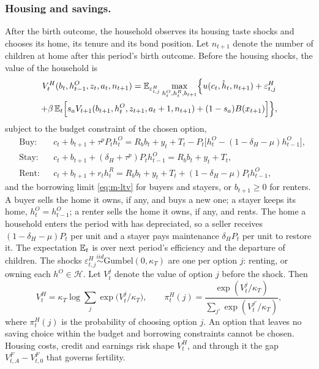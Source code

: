 \subsubsection*{Housing and savings.}
After the birth outcome, the household observes its housing taste shocks and
chooses its home, its tenure and its bond position. Let $n_{t+1}$ denote the
number of children at home after this period's birth outcome. Before the
housing shocks, the value of the household is
\begin{multline}
 V^H_t(b_t,h^O_{t-1},z_t,a_t,n_{t+1})
 =\mathbb E_{\varepsilon^H_{t,j}}\max_{h^O_t,h^R_t,b_{t+1}}
 \Bigl\{u(c_t,\hat h_t,n_{t+1})+\varepsilon^H_{t,j}\\
 +\beta\,\mathbb E_t\Bigl[s_aV_{t+1}(b_{t+1},h^O_t,z_{t+1},a_t+1,n_{t+1})
 +(1-s_a)B(x_{t+1})\Bigr]\Bigr\},
 \label{eq:m-vh}
\end{multline}
subject to the budget constraint of the chosen option,
\begin{equation}
\begin{aligned}
 &\text{Buy:}  && c_t+b_{t+1}+\tau^pP_th^O_t=R_bb_t+y_t+T_t-P_t\bigl[h^O_t-(1-\delta_H-\mu)h^O_{t-1}\bigr],\\
 &\text{Stay:} && c_t+b_{t+1}+(\delta_H+\tau^p)P_th^O_{t-1}=R_bb_t+y_t+T_t,\\
 &\text{Rent:} && c_t+b_{t+1}+r_th^R_t=R_bb_t+y_t+T_t+(1-\delta_H-\mu)P_th^O_{t-1},
\end{aligned}
 \label{eq:m-budget}
\end{equation}
and the borrowing limit \eqref{eq:m-ltv} for buyers and stayers, or
$b_{t+1}\ge0$ for renters. A buyer sells the home it owns, if any, and buys a
new one; a stayer keeps its home, $h^O_t=h^O_{t-1}$; a renter sells the home
it owns, if any, and rents. The home a household enters the period with has
depreciated, so a seller receives $(1-\delta_H-\mu)P_t$ per unit and a stayer
pays maintenance $\delta_HP_t$ per unit to restore it. The expectation $\mathbb E_t$ is over next period's efficiency and the
departure of children. The shocks
$\varepsilon^H_{t,j}\overset{iid}{\sim}\text{Gumbel}(0,\kappa_T)$ are one per
option $j$: renting, or owning each $h^O\in\mathcal H$. Let $V^j_t$ denote the
value of option $j$ before the shock. Then
\begin{equation}
 V^H_t=\kappa_T\log\sum_{j}\exp\bigl(V^j_t/\kappa_T\bigr),
 \qquad
 \pi^H_t(j)=\frac{\exp(V^j_t/\kappa_T)}{\sum_{j'}\exp(V^{j'}_t/\kappa_T)},
 \label{eq:m-tenure}
\end{equation}
where $\pi^H_t(j)$ is the probability of choosing option $j$. An option that
leaves no saving choice within the budget and borrowing constraints cannot be
chosen. Housing costs, credit and earnings risk shape $V^H_t$, and through it
the gap $V^F_{t,A}-V^F_{t,0}$ that governs fertility.

